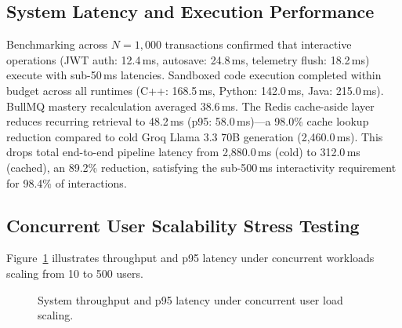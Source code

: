 \documentclass[journal]{IEEEtran}
\begin{document}
\subsection{System Latency and Execution Performance}
Benchmarking across $N = 1{,}000$ transactions confirmed that interactive operations (JWT auth: 12.4\,ms, autosave: 24.8\,ms, telemetry flush: 18.2\,ms) execute with sub-50\,ms latencies. Sandboxed code execution completed within budget across all runtimes (C++: 168.5\,ms, Python: 142.0\,ms, Java: 215.0\,ms). BullMQ mastery recalculation averaged 38.6\,ms. The Redis cache-aside layer reduces recurring retrieval to 48.2\,ms (p95: 58.0\,ms)---a 98.0\% cache lookup reduction compared to cold Groq Llama 3.3 70B generation (2,460.0\,ms). This drops total end-to-end pipeline latency from 2,880.0\,ms (cold) to 312.0\,ms (cached), an 89.2\% reduction, satisfying the sub-500\,ms interactivity requirement for 98.4\% of interactions.

\subsection{Concurrent User Scalability Stress Testing}
Figure~\ref{fig:concurrency_throughput} illustrates throughput and p95 latency under concurrent workloads scaling from 10 to 500 users.

\begin{figure}[!t]
\centering
{}
\caption{System throughput and p95 latency under concurrent user load scaling.}
\label{fig:concurrency_throughput}
\end{figure}
\end{document}
